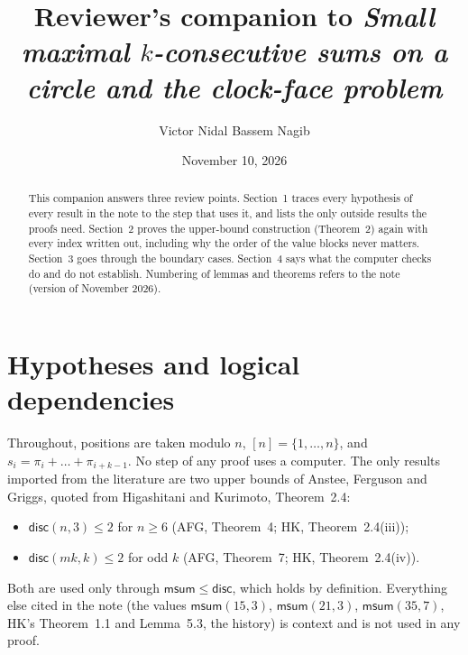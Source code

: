 \documentclass[11pt]{amsart}
\title[Reviewer's companion]{Reviewer's companion to \emph{Small maximal $k$-consecutive sums on a circle and the clock-face problem}}
\author{Victor Nidal Bassem Nagib}
\date{November 10, 2026}
\theoremstyle{remark}
\newcommand{\msum}{\mathsf{msum}}
\newcommand{\disc}{\mathsf{disc}}
\begin{document}
\begin{abstract}
This companion answers three review points. Section~1 traces every hypothesis of every result in the note to the
step that uses it, and lists the only outside results the proofs need. Section~2 proves the upper-bound
construction (Theorem~2) again with every index written out, including why the order of the value blocks never
matters. Section~3 goes through the boundary cases. Section~4 says what the computer checks do and do not
establish. Numbering of lemmas and theorems refers to the note (version of November 2026).
\end{abstract}
\maketitle

\section{Hypotheses and logical dependencies}

Throughout, positions are taken modulo $n$, $[n]=\{1,\dots,n\}$, and $s_i=\pi_i+\dots+\pi_{i+k-1}$. No step of any
proof uses a computer. The only results imported from the literature are two upper bounds of Anstee, Ferguson and
Griggs, quoted from Higashitani and Kurimoto, Theorem~2.4:
\begin{itemize}
\item[(AFG4)] $\disc(n,3)\le2$ for $n\ge6$ (AFG, Theorem~4; HK, Theorem~2.4(iii));
\item[(AFG7)] $\disc(mk,k)\le2$ for odd $k$ (AFG, Theorem~7; HK, Theorem~2.4(iv)).
\end{itemize}
Both are used only through $\msum\le\disc$, which holds by definition. Everything else cited in the note (the
values $\msum(15,3)$, $\msum(21,3)$, $\msum(35,7)$, HK's Theorem~1.1 and Lemma~5.3, the history) is context and is
not used in any proof.
\end{document}
